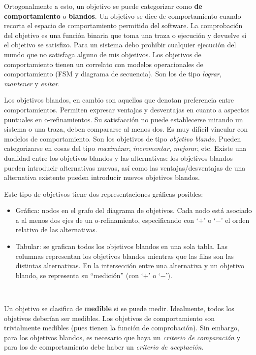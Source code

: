 \documentclass[]{article}
\begin{document}
Ortogonalmente a esto, un objetivo se puede categorizar como \textbf{de comportamiento} o \textbf{blandos}. Un objetivo se dice de comportamiento cuando recorta el espacio de comportamiento permitido del software. La comprobación del objetivo es una función binaria que toma una traza o ejecución y devuelve si el objetivo se satisfizo. Para un sistema debo prohibir cualquier ejecución del mundo que no satisfaga alguno de mis objetivos. Los objetivos de comportamiento tienen un correlato con modelos operacionales de comportamiento (FSM y diagrama de secuencia). Son los de tipo \textit{lograr}, \textit{mantener} y \textit{evitar}.

Los objetivos blandos, en cambio son aquellos que denotan preferencia entre comportamientos. Permiten expresar ventajas y desventajas en cuanto a aspectos puntuales en o-refinamientos. Su satisfacción no puede establecerse mirando un sistema o una traza, deben compararse al menos dos. Es muy difícil vincular con modelos de comportamiento. Son los objetivos de tipo \textit{objetivo blando}. Pueden categorizarse en cosas del tipo \textit{maximizar}, \textit{incrementar}, \textit{mejorar}, etc. Existe una dualidad entre los objetivos blandos y las alternativas: los objetivos blandos pueden introducir alternativas nuevas, así como las ventajas/desventajas de una alternativa existente pueden introducir nuevos objetivos blandos.

Este tipo de objetivos tiene dos representaciones gráficas posibles:
\begin{itemize}
	\item Gráfica: nodos en el grafo del diagrama de objetivos. Cada nodo está asociado a al menos dos ejes de un o-refinamiento, especificando con `$+$' o `$-$' el orden relativo de las alternativas.
	\item Tabular: se grafican todos los objetivos blandos en una sola tabla. Las columnas representan los objetivos blandos mientras que las filas son las distintas alternativas. En la intersección entre una alternativa y un objetivo blando, se representa su ``medición'' (con `$+$' o `$-$').
\end{itemize}~\newline

Un objetivo se clasifica de \textbf{medible} si se puede medir. Idealmente, todos los objetivos deberían ser medibles. Los objetivos de comportamiento son trivialmente medibles (pues tienen la función de comprobación). Sin embargo, para los objetivos blandos, es necesario que haya un \textit{criterio de comparación} y para los de comportamiento debe haber un \textit{criterio de aceptación}.
\end{document}

